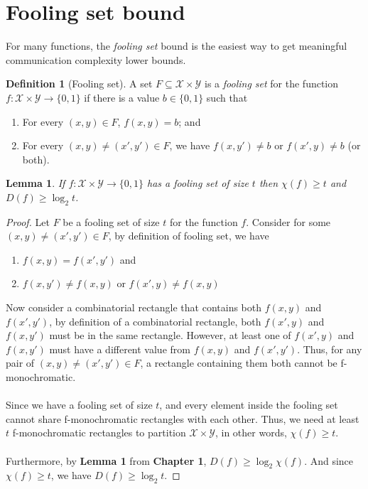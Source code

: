 \documentclass[11pt,oneside]{book}
\theoremstyle{plain}
\newtheorem{lemma}{Lemma}
\theoremstyle{definition}
\newtheorem{definition}{Definition}
\theoremstyle{plain}
\newcommand{\calX}{\mathcal{X}}
\newcommand{\calY}{\mathcal{Y}}
\begin{document}
\newpage \section{Fooling set bound}

For many functions, the \emph{fooling set} bound is the easiest way to get meaningful communication complexity lower bounds.

\begin{definition}[Fooling set]
	A set $F \subseteq \calX \times \calY$ is a \emph{fooling set} for the function $f : \calX \times \calY \to \{0,1\}$ if there is a value $b \in \{0,1\}$ such that
	\begin{enumerate}
		\item For every $(x,y) \in F$, $f(x,y) = b$; and
		\item For every $(x,y) \neq (x',y') \in F$, we have $f(x,y') \neq b$ or $f(x',y) \neq b$ (or both).
	\end{enumerate}
\end{definition}

\begin{lemma}
	If $f : \mathcal{X} \times \mathcal{Y} \to \{0,1\}$ has a fooling set of size $t$ then $\chi(f) \ge t$ and $D(f) \ge \log_2 t$.
\end{lemma}

\begin{proof}
	Let $F$ be a fooling set of size $t$ for the function $f$. Consider for some $(x,y) \neq (x',y') \in F$, by definition of fooling set, we have
	\begin{enumerate} 
		\item $f(x,y) = f(x',y')$ and 
		\item $f(x,y') \neq f(x,y)$ or $f(x',y) \neq f(x,y)$ 
	\end{enumerate}
	Now consider a combinatorial rectangle that contains both $f(x,y)$ and $f(x',y')$, by definition of a combinatorial rectangle, both $f(x',y )$ and $f(x,y')$ must be in the same rectangle. However, at least one of $f(x',y )$ and $f(x,y')$ must have a different value from $f(x,y)$ and $f(x',y')$. Thus, for any pair of $(x,y) \neq (x',y') \in F$, a rectangle containing them both cannot be f-monochromatic.\\
	\\
	Since we have a fooling set of size $t$, and every element inside the fooling set cannot share f-monochromatic rectangles with each other. Thus, we need at least $t$ f-monochromatic rectangles to partition $\calX \times \calY$, in other words, $\chi(f) \ge t$.\\
	\\
	Furthermore, by \textbf{Lemma 1} from \textbf{Chapter 1}, $D(f) \ge \log_2 \chi(f)$. And since $\chi(f) \ge t$, we have $D(f) \ge \log_2 t$.
\end{proof}
\end{document}

